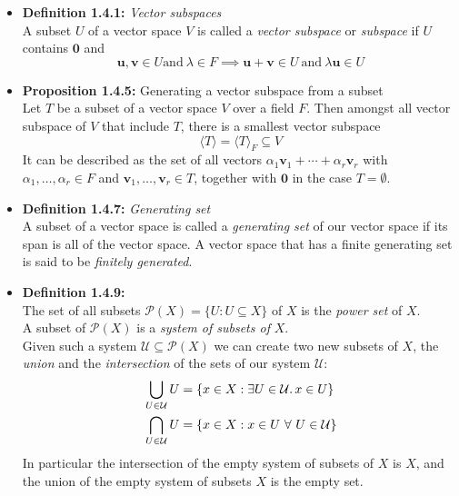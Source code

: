 \documentclass[11pt,a4paper]{article}
\begin{document}
\begin{itemize}

    \item \textbf{Definition 1.4.1:} \emph{Vector subspaces} \\
        A subset $U$ of a vector space $V$ is called a \emph{vector subspace} or \emph{subspace}
        if $U$ contains $\textbf{0}$ and
        \[
            \textbf{u}, \textbf{v} \in U  \text{and} \ \lambda \in F \implies
            \textbf{u} + \textbf{v} \in U \ \text{and} \ \lambda \textbf{u} \in U
        \]

    \item \textbf{Proposition 1.4.5:} Generating a vector subspace from a subset \\
        Let $T$ be a subset of a vector space $V$ over a field $F$.
        Then amongst all vector subspace of $V$ that include $T$,
        there is a smallest vector subspace
        \[
            \langle T \rangle = \langle T \rangle _F \subseteq V
        \]
        It can be described as the set of all vectors
        $\alpha_1 \textbf{v}_1 + \cdots + \alpha_r \textbf{v}_r$ with
        $\alpha_1, \ldots, \alpha_r \in F$ and $\textbf{v}_1, \ldots, \textbf{v}_r \in T$,
        together with $\textbf{0}$ in the case $T = \emptyset$.

    \item \textbf{Definition 1.4.7:} \emph{Generating set} \\
        A subset of a vector space is called a \emph{generating set} of our vector space if its
        span is all of the vector space.
        A vector space that has a finite generating set is said to be \emph{finitely generated}.

    \item \textbf{Definition 1.4.9:} \\
        The set of all subsets $\mathcal{P}(X) = \{U : U \subseteq X \}$ of $X$ is the
        \emph{power set} of $X$. \\
        A subset of $\mathcal{P}(X)$ is a \emph{system of subsets of} $X$. \\
        Given such a system $\mathcal{U} \subseteq \mathcal{P}(X)$ we can create two new subsets
        of $X$,
        the \emph{union} and the \emph{intersection} of the sets of our system $\mathcal{U}$:
        \begin{align*}{}
            \bigcup_{U \in \mathcal{U}} U &=
            \{x \in X : \exists U \in \mathcal{U} \ldotp x \in U\} \\
            \bigcap_{U \in \mathcal{U}} U &= \{x \in X : x \in U \ \forall \ U \in \mathcal{U}\}
        \end{align*}
        In particular the intersection of the empty system of subsets of $X$ is $X$,
        and the union of the empty system of subsets $X$ is the empty set.
\end{itemize}
\end{document}
